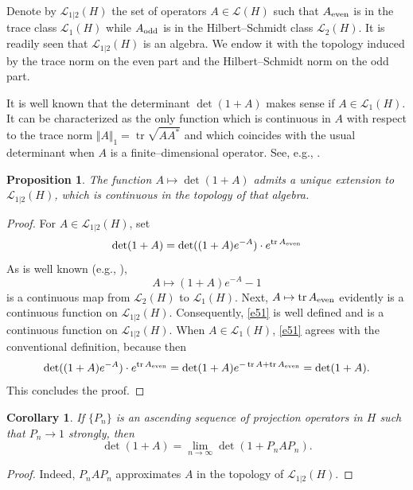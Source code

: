 \documentclass[12pt]{amsart}
\newcommand{\tr}{\operatorname{tr}}
\newcommand{\Lc}{\mathcal{L}}
\newcommand{\LH}{\mathcal{L}_{1|2}(H)}
\theoremstyle{plain}
\newtheorem{proposition}[lemma]{Proposition}
\newtheorem{corollary}[lemma]{Corollary}
\theoremstyle{definition}
\numberwithin{equation}{section}
\begin{document}
Denote by $\LH$ the set of operators $A\in \Lc(H)$ such that $A_{\textup{even}}$ is in the
trace class $\Lc_1(H)$ while $A_{\textup{odd}}$ is in the Hilbert--Schmidt class 
$\Lc_2(H)$. It is readily seen that $\LH$ is an algebra. We endow it with the
topology induced by the trace norm on the even part and the Hilbert--Schmidt
norm on the odd part. 

It is well known that the determinant $\det(1+A)$ makes sense if $A\in\Lc_1(H)$. 
It can be characterized as the only function which is continuous in $A$ with respect
 to the trace norm $\Vert A\Vert_1=\tr\sqrt{AA^*}$ and which coincides with the usual 
determinant when $A$ is a finite--dimensional operator. See, e.g., \cite{Si}.

\begin{proposition}\label{p51} The function $A\mapsto \det(1+A)$ admits a unique extension to $\LH$,
 which is continuous in the topology of that algebra.
\end{proposition}

\begin{proof} For $A\in\LH$, set
%
\begin{equation}\label{e51}
\det(1+A)=\det((1+A)e^{-A})\cdot e^{\tr A_{\textup{even}}} 
\end{equation}
%
As is well known (e.g., \cite{Si}), 
%
\begin{equation*}
A\mapsto (1+A)e^{-A}-1
\end{equation*}
%
is a continuous map from $\Lc_2(H)$ to $\Lc_1(H)$.  Next, $A\mapsto \tr A_{\textup{even}}$
evidently is a continuous function on $\LH$. Consequently, \eqref{e51}  is well 
defined and is a continuous function on $\LH$. 
When $A\in\Lc_1(H)$, \eqref{e51} agrees with the conventional definition, because then 
%
\begin{equation*}
\det((1+A)e^{-A})\cdot e^{\tr A_{\textup{even}}}=\det(1+A)e^{-\tr A+\tr A_{\textup{even}}}=
\det(1+A).
\end{equation*}
%
This concludes the proof. \end{proof}


\begin{corollary}\label{c52} If $\{P_n\}$ is an ascending sequence of projection operators in $H$ such that $P_n\to1$ strongly, then 
%
\begin{equation*}
\det(1+A)=\lim_{n\to\infty}\det(1+P_n A P_n).
\end{equation*}
% 
\end{corollary} 

\begin{proof} Indeed, $P_nAP_n$ approximates $A$ in the topology of $\LH$. \end{proof}
\end{document}
